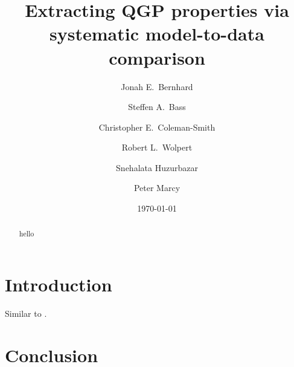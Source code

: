 \documentclass[aps,prc,reprint,amsmath]{revtex4-1}
\begin{document}
\title{Extracting QGP properties via systematic model-to-data comparison}

\author{Jonah E.\ Bernhard}
\author{Steffen A.\ Bass}
\author{Christopher E.\ Coleman-Smith}
\author{Robert L.\ Wolpert}

\author{Snehalata Huzurbazar}

\author{Peter Marcy}

\date{\today}


\begin{abstract}
  hello
\end{abstract}

\maketitle

\section{Introduction}

Similar to \cite{pratt-mtd, soltz-mtd}.

\section{Conclusion}

\cite{alice-cumulants}


\end{document}
